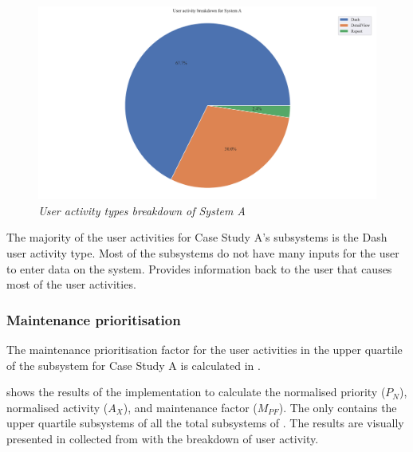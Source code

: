 \begin{figure}[!htb]
	\centering %
	\includegraphics[width=0.95\linewidth]{img/ch3/analysis/case_A_breakdown.pdf}
	\caption[User activity types breakdown of System A]
	{\textit{User activity types breakdown of System A}}\label{fig:ch3_caseABreakdown}
\end{figure} 

The  majority of the user activities for Case Study A's subsystems is the Dash user activity type. Most of the subsystems do not have many inputs for the user to enter data on the system. Provides information back to the user that causes most of the user activities. 

\subsubsection{Maintenance prioritisation}
The maintenance prioritisation factor for the user activities in the upper quartile of the subsystem for Case Study A is calculated in .



 shows the results of the implementation  to calculate the normalised priority ($P_N$), normalised activity ($A_X$), and maintenance factor ($M_{PF}$). The  only contains the upper quartile subsystems of all the total subsystems of . The results are visually presented in  collected from  with the breakdown of user activity.

\clearpage

